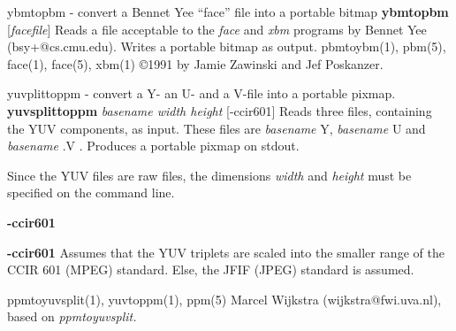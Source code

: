 ybmtopbm - convert a Bennet Yee ``face'' file into a portable bitmap
{\bf ybmtopbm}
{\rm [}{\it facefile}{\rm ]}
Reads a file acceptable to the
{\it face}
and
{\it xbm}
programs by Bennet Yee (bsy+@cs.cmu.edu).
Writes a portable bitmap as output.
pbmtoybm(1), pbm(5), face(1), face(5), xbm(1)
\copyright 1991 by Jamie Zawinski and Jef Poskanzer.
%
 
%

\newpage
%

yuvplittoppm - convert a Y- an U- and a V-file into a portable pixmap.
{\bf yuvsplittoppm}
{\it basename width height}
[-ccir601]
Reads three files, containing the YUV components, as input.
These files are
{\it basename}
Y,
{\it basename}
U
and
{\it basename}
.V .
Produces a portable pixmap on stdout.

Since the YUV files are raw files, the dimensions
{\it width}
and
{\it height}
must be specified on the command line.
\begin{TPlist}{{\bf -ccir601}}
\item[{{\bf -ccir601}}]
Assumes that the YUV triplets are scaled into the smaller range of the
CCIR 601 (MPEG) standard. Else, the JFIF (JPEG) standard is assumed.
\end{TPlist}

ppmtoyuvsplit(1), yuvtoppm(1), ppm(5)
Marcel Wijkstra (wijkstra@fwi.uva.nl), based on {\it ppmtoyuvsplit.}
%
 
